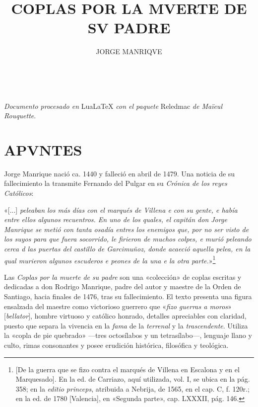\documentclass[11pt,a4paper,twoside]{article}
\title{COPLAS POR LA MVERTE DE SV PADRE}
\author{\fontsize{14}{11.96}\selectfont JORGE MANRIQVE}
\date{\vspace{60pt}\fontsize{11}{11}\selectfont{EDICIÓN CRÍTICA LIMINAR}\\\fontsize{40}{11}\selectfont{\vfill\LaTeX}}
\newcommand{\comillas}[1]{«#1»}
\begin{document}
	{
	\maketitle
}
	\newpage

\null
\vfill
\begin{flushright}
	\textit{Documento procesado en} LuaLaTeX \textit{con el paquete} Reledmac \textit{de Maïeul Rouquette}.
\end{flushright}
\newpage

\tableofcontents
\newpage

\setcounter{page}{1}
\section*{{\fontsize{13}{14.35}\selectfont APVNTES}}

Jorge Manrique nació ca. 1440 y falleció en abril de 1479. Una noticia de su fallecimiento la transmite Fernando del Pulgar en su \textit{Crónica de los reyes Católicos}:

\comillas{[...] \textit{peleaban los más días con el marqués de Villena e con su gente, e había entre ellos algunos recuentros. En uno de los quales, el capitán don Jorge Manrique se metió con tanta osadía entres los enemigos que, por no ser visto de los suyos para que fuera socorrido, le firieron de muchos colpes, e murió peleando cerca d las puertas del castillo de Garcimuñoz, donde acaeció aquella pelea, en la qual murieron algunos escuderos e peones de la una e la otra parte.}}\footnote{[De la guerra que se fizo contra el marqués de Villena en Escalona y en el Marquesado]. En la ed. de Carriazo, aquí utilizada, vol. I, se ubica en la pág. 358; en la \textit{editio princeps}, atribuida a Nebrija, de 1565, en el cap. C, f. 120r.; en la ed. de 1780 [Valencia], en \comillas{Segunda parte}, cap. LXXXII, pág. 146.} \vspace{5pt}

Las \textit{Coplas por la muerte de su padre} son una «colección» de coplas escritas y dedicadas a don Rodrigo Manrique, padre del autor y maestre de la Orden de Santiago, hacia finales de 1476, tras su fallecimiento. El texto presenta una figura ensalzada del maestre como victorioso guerrero que \comillas{\textit{fizo guerras a moros}} [\textit{bellator}], hombre virtuoso y católico honrado, detalles apreciables con claridad, puesto que separa la vivencia en la \textit{fama} de la \textit{terrenal} y la \textit{trascendente}. Utiliza la \comillas{copla de pie quebrado} —tres octosílabos y un tetrasílabo—, lenguaje llano y culto, rimas consonantes y posee erudición histórica, filosófica y teológica.
\end{document}
